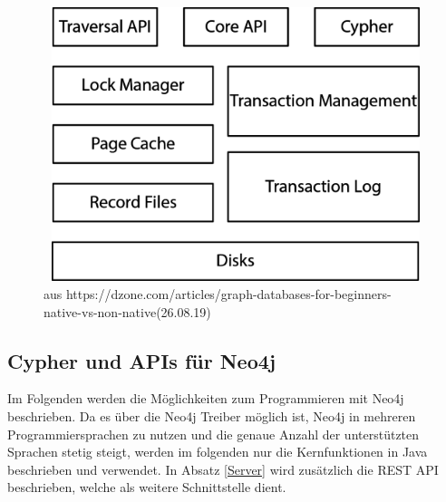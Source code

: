 \begin{figure}[H]
	\centering
	\includegraphics [width=12cm, height=8cm]{Figures/architecture}
	\caption[Architekur von Neo4j]{ aus https://dzone.com/articles/graph-databases-for-beginners-native-vs-non-native(26.08.19)}
	\label{fig:Architecure}
\end{figure}

\subsection{Cypher und APIs für Neo4j}
Im Folgenden werden die Möglichkeiten zum Programmieren mit Neo4j beschrieben. Da es über die Neo4j Treiber möglich ist, Neo4j in mehreren Programmiersprachen zu nutzen und die genaue Anzahl der unterstützten Sprachen stetig steigt, werden im folgenden nur die Kernfunktionen in Java beschrieben und verwendet. In Absatz \ref{Server} wird zusätzlich die REST API beschrieben, welche als weitere Schnittstelle dient.

